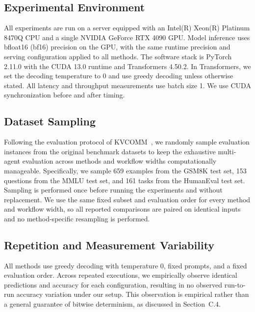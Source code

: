 \documentclass[letterpaper]{article} %
\begin{document}
\subsection{Experimental Environment}

All experiments are run on a server equipped with an Intel(R) Xeon(R) Platinum 8470Q CPU and a single NVIDIA GeForce RTX 4090 GPU. Model inference uses bfloat16 (bf16) precision on the GPU, with the same runtime precision and serving configuration applied to all methods. The software stack is PyTorch 2.11.0 with the CUDA 13.0 runtime and Transformers 4.50.2. In Transformers, we set the decoding temperature to 0 and use greedy decoding unless otherwise stated. All latency and throughput measurements use batch size 1. We use CUDA synchronization before and after timing.

\subsection{Dataset Sampling}

Following the evaluation protocol of KVCOMM~\citep{DBLP:journals/corr/abs-2510-12872}, we randomly sample evaluation instances from the original benchmark datasets to keep the exhaustive multi-agent evaluation across methods and workflow widths computationally manageable. Specifically, we sample 659 examples from the GSM8K test set, 153 questions from the MMLU test set, and 161 tasks from the HumanEval test set. Sampling is performed once before running the experiments and without replacement. We use the same fixed subset and evaluation order for every method and workflow width, so all reported comparisons are paired on identical inputs and no method-specific resampling is performed.

\subsection{Repetition and Measurement Variability}

All methods use greedy decoding with temperature 0, fixed prompts, and a fixed evaluation order. Across repeated executions, we empirically observe identical predictions and accuracy for each configuration, resulting in no observed run-to-run accuracy variation under our setup. This observation is empirical rather than a general guarantee of bitwise determinism, as discussed in Section~C.4.
\end{document}
